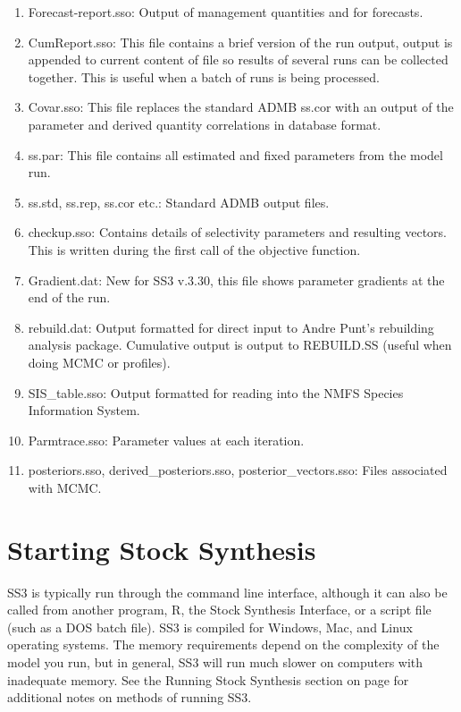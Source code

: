 \begin{enumerate}
		\item Forecast-report.sso: Output of management quantities and for forecasts.
		\item CumReport.sso: This file contains a brief version of the run output, output is appended to current content of file so results of several runs can be collected together.  This is useful when a batch of runs is being processed.
		\item Covar.sso: This file replaces the standard ADMB ss.cor with an output of the parameter and derived quantity correlations in database format.
		\item ss.par: This file contains all estimated and fixed parameters from the model run. 
		\item ss.std, ss.rep, ss.cor etc.:  Standard ADMB output files.
		\item checkup.sso: Contains details of selectivity parameters and resulting vectors.  This is written during the first call of the objective function.
		\item Gradient.dat: New for SS3 v.3.30, this file shows parameter gradients at the end of the run.
		\item rebuild.dat: Output formatted for direct input to Andre Punt's rebuilding analysis package.  Cumulative output is output to REBUILD.SS (useful when doing MCMC or profiles).
		\item SIS\_table.sso: Output formatted for reading into the NMFS Species Information System.
		\item Parmtrace.sso: Parameter values at each iteration.
		\item posteriors.sso, derived\_posteriors.sso, posterior\_vectors.sso: Files associated with MCMC.
	\end{enumerate}

\pagebreak
		
\section{Starting Stock Synthesis}
SS3 is typically run through the command line interface, although it can also be called from another program, R, the Stock Synthesis Interface, or a script file (such as a DOS batch file). SS3 is compiled for Windows, Mac, and Linux operating systems. The memory requirements depend on the complexity of the model you run, but in general, SS3 will run much slower on computers with inadequate memory. See the Running Stock Synthesis section on page \pageref{sec:RunningSS} for additional notes on methods of running SS3.

